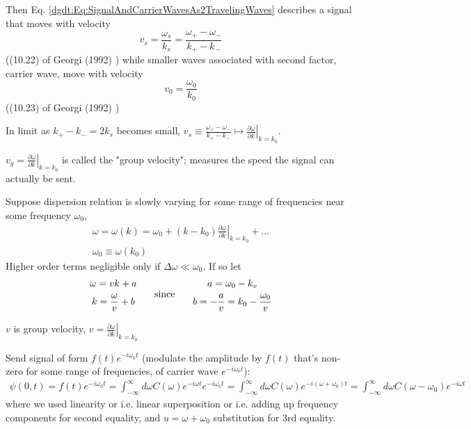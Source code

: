 Then Eq. \ref{dgdt:Eq:SignalAndCarrierWavesAs2TravelingWaves} describes a signal that moves with velocity
\begin{equation}
	v_s = \frac{ \omega_s }{k_s } = \frac{ \omega_+ - \omega_- }{ k_+ - k_- }
\end{equation}
((10.22) of Georgi (1992) \cite{dgdt:Geor1992}) while smaller waves associated with second factor, carrier wave, move with velocity 
\begin{equation}
	v_0 = \frac{\omega_0}{k_0}
\end{equation}
((10.23) of Georgi (1992) \cite{dgdt:Geor1992})

In limit as $k_+ - k_- = 2k_s$ becomes small, $v_s \equiv \frac{\omega_+ - \omega_- }{ k_+ - k_-} \mapsto \left. \frac{\partial \omega}{\partial k} \right|_{k=k_0}$.

$v_g = \left. \frac{\partial \omega}{ \partial k} \right|_{k=k_0}$ is called the "group velocity"; measures the speed the signal can actually be sent.

Suppose dispersion relation is slowly varying for some range of frequencies near some frequency $\omega_0$, 
\[
\begin{gathered}
	\omega = \omega(k) = \omega_0 + (k- k_0) \left. \frac{ \partial \omega}{ \partial k } \right|_{k=k_0} + \dots \\
	\omega_0 \equiv \omega(k_0)
\end{gathered}
\]
Higher order terms negligible only if $\Delta \omega \ll \omega_0$. If so let 
\[
\begin{gathered}
	\begin{gathered}
		\omega = vk + a \\
		k = \frac{\omega}{v} + b
	\end{gathered} \text{ \quad \, since \quad \, } \begin{gathered}
	a = \omega_0 - k_v \\
	b = -\frac{a}{v} = k_0 - \frac{ \omega_0}{v}
\end{gathered}
\end{gathered}
\]

$v$ is group velocity, $\left. v = \frac{\partial \omega}{ \partial k} \right|_{k=k_0}$

Send signal of form $f(t) e^{-i\omega_0 t}$ (modulate the amplitude by $f(t)$ that's non-zero for some range of frequencies, of carrier wave $e^{-i \omega_0 t}$):
\[
\begin{gathered}
	\psi(0,t) = f(t) e^{-i \omega_0 t} = \int_{-\infty}^{\infty} d\omega C(\omega) e^{-i\omega t} e^{-i\omega_0 t} = \int_{-\infty}^{\infty} d\omega C(\omega) e^{-i(\omega + \omega_0)t} = \int_{-\infty}^{\infty} d\omega C(\omega - \omega_0) e^{-i\omega t}
\end{gathered}
\]
where we used linearity or i.e. linear superposition or i.e. adding up frequency components for second equality, and $u= \omega + \omega_0$ substitution for 3rd equality.

